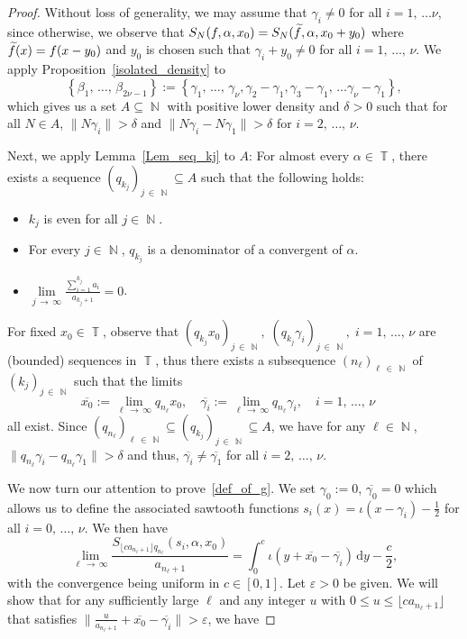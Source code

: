 \documentclass[AHL,Unicode,longabstracts,published]{cedram}
\DeclareMathOperator{\N}{\mathbb{N}}
\DeclareMathOperator{\T}{\mathbb{T}}
\newcommand{\rmd}{\mathrm{d}}
\newcommand{\kj}{n_{\ell}}
\let\oldtilde\tilde
\renewcommand*{\tilde}[1]{\mathchoice{\widetilde{#1}}{\widetilde{#1}}{\oldtilde{#1}}{\oldtilde{#1}}}
\begin{document}
\begin{proof}
Without loss of generality, we may assume that $\gamma_i \neq 0$ for all $i = 1,\,\ldots\nu$, since otherwise, we observe that $S_N(f,\alpha,x_0) = S_N(\tilde{f},\alpha,x_0 + y_0)$ where $\tilde{f}(x) = f(x- y_0)$ and $y_0$ is chosen such that $\gamma_i + y_0 \neq 0$ for all $i = 1,\,\ldots,\,\nu$. We apply Proposition~\ref{isolated_density} to
\[
\left\{\beta_1,\,\ldots,\,\beta_{2\nu-1}\right\} := \left\{\gamma_1,\,\ldots,\,\gamma_{\nu},\gamma_2 - \gamma_1,\gamma_3-\gamma_1,\,\ldots\gamma_{\nu}-\gamma_{1}\right\},
\]
which gives us a set $A \subseteq \N$ with positive lower density and $\delta > 0$ such that for all $N \in A$, $ \| N\gamma_i\| > \delta$ and $\| N\gamma_i - N\gamma_1\| > \delta$ for $ i = 2,\,\ldots,\,\nu$.

Next, we apply Lemma~\ref{Lem_seq_kj} to $A$: For almost every $\alpha \in \T$, there exists a sequence $(q_{k_j})_{j\,\in \,\N} \subseteq A$ such that the following holds:
\begin{itemize}
\item $k_j$ is even for all $j \in \N$.
\item For every $j \in \N$, $q_{k_j}$ is a denominator of a convergent of $\alpha$.
\item $\lim\limits_{j\,\to\,\infty} \frac{\sum_{i =1}^{k_j} a_i }{a_{k_j+1}} = 0$.
\end{itemize}

For fixed $x_0 \in \T$, observe that $(q_{k_j}x_0)_{j\,\in\,\N},\; (q_{k_j}\gamma_i)_{j\,\in\,\N}, \; i = 1,\,\ldots,\,\nu$ are (bounded) sequences in $\T$, thus there exists a subsequence $(n_{\ell})_{\ell\,\in\,\N}$ of $(k_{j})_{j\,\in\,\N} $ such that the limits
\[
\overline{x_0} := \lim_{\ell\,\to\,\infty} q_{\kj}x_0, \quad \overline{\gamma_i} := \lim_{\ell\,\to\,\infty} q_{\kj}\gamma_i, \quad i = 1,\,\ldots,\,\nu \quad
\]
all exist. Since $(q_{\kj})_{\ell\,\in\,\N} \subseteq (q_{k_j})_{j\,\in\,\N} \subseteq A$, we have for any $\ell \in \N$, $\| q_{\kj}\gamma_i - q_{\kj}\gamma_1\| > \delta$ and thus, $\overline{\gamma_i} \neq \overline{\gamma_1}$ for all $i = 2,\,\ldots,\,\nu$.

We now turn our attention to prove~\eqref{def_of_g}. We set $\gamma_0:=0$, $\overline{\gamma_0}=0$ which allows us to define the associated sawtooth functions $s_i(x) = \iota(x-\gamma_i) - \frac{1}{2}$ for all $i=0,\,\ldots,\,\nu$. We then have
\begin{equation}\label{sawtooth_fct}
\lim_{\ell\,\to\,\infty} \frac{S_{ \lfloor c a_{\kj+1}\rfloor q_{\kj}}(s_i,\alpha,x_0)}{a_{\kj+1}} = \int_{0}^{c} \iota(y + \overline{x_0} - \overline{\gamma_i}) \, \rmd y - \frac{c}{2},
\end{equation}
with the convergence being uniform in $c \in [0,1]$. Let $\varepsilon > 0$ be given. We will show that for any sufficiently large $\ell$ and any integer $u$ with $0 \leq u \leq \lfloor c a_{\kj+1}\rfloor$ that satisfies $\|\frac{u}{a_{\kj +1}} + \overline{x_0}- \overline{\gamma_i}\| > \varepsilon$, we have


\end{proof}
\end{document}

